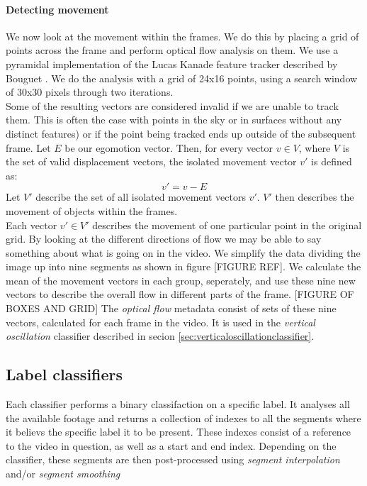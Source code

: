 \paragraph{Detecting movement}
%
We now look at the movement within the frames. We do this by placing a grid of points across the frame and perform optical flow analysis on them. We use a pyramidal implementation of the Lucas Kanade feature tracker described by Bouguet \cite{Bouguet2000}.
We do the analysis with a grid of 24x16 points, using a search window of 30x30 pixels through two iterations.\\%
%
Some of the resulting vectors are considered invalid if we are unable to track them. This is often the case with points in the sky or in surfaces without any distinct features) or if the point being tracked ends up outside of the subsequent frame. Let $E$ be our egomotion vector. Then, for every vector $v \in V$, where $V$ is the set of valid displacement vectors, the isolated movement vector $v'$ is defined as:
\begin{equation}
v' = v - E
\end{equation}
Let $V'$ describe the set of all isolated movement vectors $v'$. $V'$ then describes the movement of objects within the frames.\\
Each vector $v' \in V'$ describes the movement of one particular point in the original grid. By looking at the different directions of flow we may be able to say something about what is going on in the video. We simplify the data dividing the image up into nine segments as shown in figure [FIGURE REF]. We calculate the mean of the movement vectors in each group, seperately, and use these nine new vectors to describe the overall flow in different parts of the frame.
%
%
[FIGURE OF BOXES AND GRID]
%
The \textit{optical flow} metadata consist of sets of these nine vectors, calculated for each frame in the video. It is used in the \textit{vertical oscillation} classifier described in secion \ref{sec:verticaloscillationclassifier}.
%
%
%
%
%
\subsection{Label classifiers}
%
Each classifier performs a binary classifaction on a specific label. It analyses all the available footage and returns a collection of indexes to all the segments where it believs the specific label it to be present. These indexes consist of a reference to the video in question, as well as a start and end index. Depending on the classifier, these segments are then post-processed using \textit{segment interpolation} and/or \textit{segment smoothing}
%
